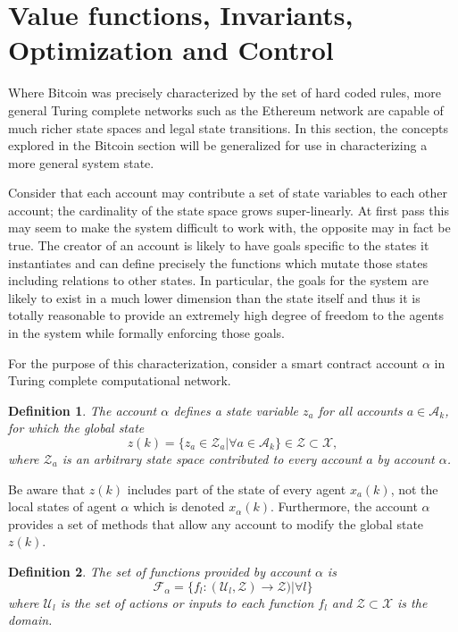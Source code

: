 \documentclass[letterpaper, 10 pt, conference]{ieeeconf}  %
\newtheorem{definition}{Definition}
\begin{document}
\section{Value functions, Invariants, Optimization and Control} \label{sec:Control}

Where Bitcoin was precisely characterized by the set of hard coded rules, more general Turing complete networks such as the Ethereum network are capable of much richer state spaces and legal state transitions. In this section, the concepts explored in the Bitcoin section will be generalized for use in characterizing a more general system state.

Consider that each account may contribute a set of state variables to each other account; the cardinality of the state space grows super-linearly. At first pass this may seem to make the system difficult to work with, the opposite may in fact be true. The creator of an account is likely to have goals specific to the states it instantiates and can define precisely the functions which mutate those states including relations to other states. In particular, the goals for the system are likely to exist in a much lower dimension than the state itself and thus it is totally reasonable to provide an extremely high degree of freedom to the agents in the system while formally enforcing those goals.

For the purpose of this characterization, consider a smart contract account $\alpha$ in Turing complete computational network.  
\begin{definition}
The account $\alpha$ defines a state variable $z_a$ for all accounts $a\in \mathcal{A}_k$, for which the global state 
\[
z(k) = \{z_a\in \mathcal{Z}_a | \forall a\in \mathcal{A}_k \} \in \mathcal{Z} \subset \mathcal{X},
\]
where $\mathcal{Z}_a$ is an arbitrary state space contributed to every account $a$ by account $\alpha$.  
\end{definition}

Be aware that $z(k)$ includes part of the state of every agent $x_a(k)$, not the local states of agent $\alpha$ which is denoted $x_\alpha(k)$. Furthermore, the account $\alpha$ provides a set of methods that allow any account to modify the global state $z(k)$.
\begin{definition}
The set of functions provided by account $\alpha$ is 
\begin{equation}
\mathcal{F}_{\alpha} = \{ f_l:(\mathcal{U}_l,\mathcal{Z})\rightarrow  \mathcal{Z})  | \forall l\}
\end{equation}
where $\mathcal{U}_l$ is the set of actions or inputs to each function $f_l$ and $\mathcal{Z} \subset \mathcal{X}$ is the domain. \end{definition}
\end{document}
